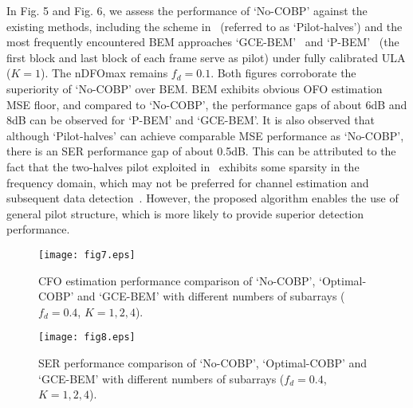 \documentclass[12pt, draftclsnofoot, onecolumn]{IEEEtran}
\begin{document}
In Fig. 5 and Fig. 6, we assess the performance of `No-COBP' against the existing methods, including the scheme in~\cite{W_Guo2017TVT} (referred to as `Pilot-halves') and the most frequently encountered BEM approaches `GCE-BEM'~\cite{H_NguyenLe2010TB} and `P-BEM'~\cite{H_Hijazi2009TVT} (the first block and last block of each frame serve as pilot) under fully calibrated ULA ($K\!=\!1$). The nDFOmax remains $f_d \!=\! 0.1$.
Both figures corroborate the superiority of `No-COBP' over BEM. BEM exhibits obvious OFO estimation MSE floor, and compared to `No-COBP', the performance gaps of about 6dB and 8dB can be observed for `P-BEM' and `GCE-BEM'.
It is also observed that although `Pilot-halves' can achieve comparable MSE performance as `No-COBP', there is an SER performance gap of about 0.5dB. This can be attributed to the fact that the two-halves pilot exploited in~\cite{W_Guo2017TVT} exhibits some sparsity in the frequency domain, which may not be preferred for channel estimation and subsequent data detection~\cite{H_Minn2006TC}. However, the proposed algorithm enables the use of general pilot structure, which is more likely to provide superior detection performance.

\begin{figure}[t]
\setlength{\abovecaptionskip}{-0.5cm}
\setlength{\belowcaptionskip}{-1.05cm}
\begin{center}
\texttt{[image: fig7.eps]}
\end{center}
\caption{ CFO estimation performance comparison of `No-COBP', `Optimal-COBP' and `GCE-BEM' with different numbers of subarrays ($f_d=0.4$, $K=1,2,4$). }
\end{figure}

\begin{figure}[t]
\setlength{\abovecaptionskip}{-0.5cm}
\setlength{\belowcaptionskip}{-1.2cm}
\begin{center}
\texttt{[image: fig8.eps]}
\end{center}
\caption{ SER performance comparison of `No-COBP', `Optimal-COBP' and `GCE-BEM' with different numbers of subarrays ($f_d=0.4$, $K=1,2,4$). }
\end{figure}
\end{document}
